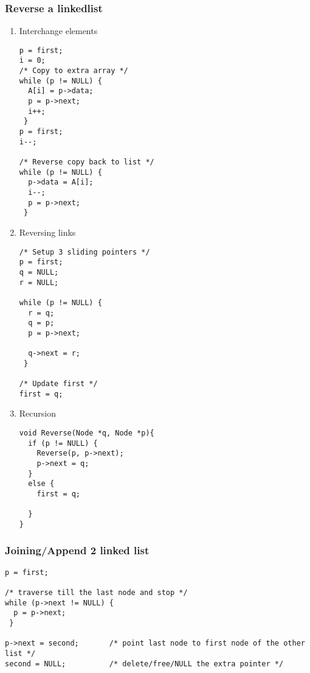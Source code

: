 \documentclass[11pt]{article}
\begin{document}
\subsubsection{Reverse a linkedlist}
\label{sec:org9177f9d}
\begin{enumerate}
\item Interchange elements
\label{sec:org015edd2}
\begin{verbatim}
p = first;
i = 0;
/* Copy to extra array */
while (p != NULL) {
  A[i] = p->data;
  p = p->next;
  i++;
 }
p = first;
i--;

/* Reverse copy back to list */
while (p != NULL) {
  p->data = A[i];
  i--;
  p = p->next;
 }
\end{verbatim}
\item Reversing links
\label{sec:orgb1cc34a}
\begin{verbatim}
/* Setup 3 sliding pointers */
p = first;
q = NULL;
r = NULL;

while (p != NULL) {
  r = q;
  q = p;
  p = p->next;

  q->next = r;
 }

/* Update first */
first = q;
\end{verbatim}
\item Recursion
\label{sec:orgf558d5a}
\begin{verbatim}
void Reverse(Node *q, Node *p){
  if (p != NULL) {
    Reverse(p, p->next);
    p->next = q;
  }
  else {
    first = q;

  }
}
\end{verbatim}
\end{enumerate}

\subsubsection{Joining/Append 2 linked list}
\label{sec:orgd1583a2}
\begin{verbatim}
p = first;

/* traverse till the last node and stop */
while (p->next != NULL) {
  p = p->next;
 }

p->next = second; 		/* point last node to first node of the other list */
second = NULL; 			/* delete/free/NULL the extra pointer */
\end{verbatim}
\end{document}
